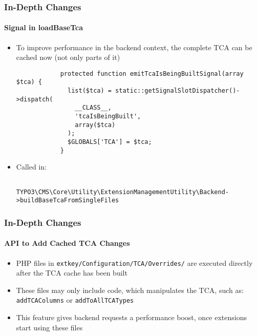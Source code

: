 \begin{frame}[fragile]
	\frametitle{In-Depth Changes}
	\framesubtitle{Signal in loadBaseTca}

	\lstset{
		basicstyle=\tiny\ttfamily
	}

	\begin{itemize}
		\item To improve performance in the backend context,
			the complete TCA can be cached now (not only parts of it)

		\begin{lstlisting}
			protected function emitTcaIsBeingBuiltSignal(array $tca) {
			  list($tca) = static::getSignalSlotDispatcher()->dispatch(
			    __CLASS__,
			    'tcaIsBeingBuilt',
			    array($tca)
			  );
			  $GLOBALS['TCA'] = $tca;
			}
		\end{lstlisting}

		\item Called in:

			\begin{lstlisting}
				TYPO3\CMS\Core\Utility\ExtensionManagementUtility\Backend->buildBaseTcaFromSingleFiles
			\end{lstlisting}

	\end{itemize}

\end{frame}  


\begin{frame}[fragile]
	\frametitle{In-Depth Changes}
	\framesubtitle{API to Add Cached TCA Changes}

	\begin{itemize}
		\item PHP files in \texttt{extkey/Configuration/TCA/Overrides/}
			are executed directly after the TCA cache has been built

		\item These files may only include code, which manipulates the TCA,\newline
			such as: \texttt{addTCAColumns} or \texttt{addToAllTCATypes}

		\item This feature gives backend requests a performance boost, once extensions start using these files

	\end{itemize}

\end{frame} 

